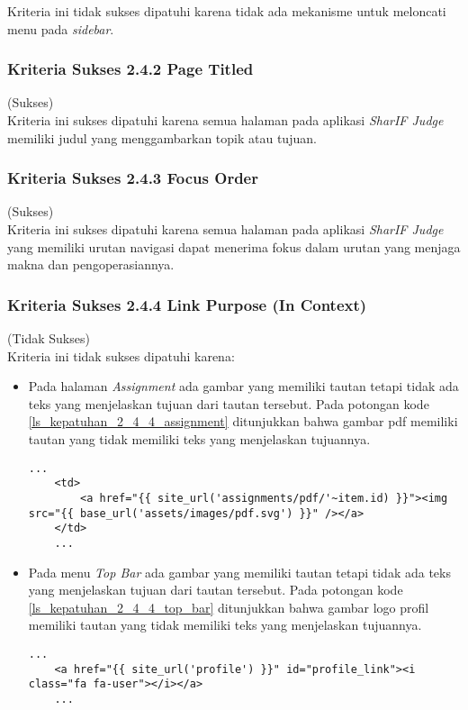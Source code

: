 Kriteria ini tidak sukses dipatuhi karena tidak ada mekanisme untuk meloncati menu pada \textit{sidebar}.

\subsubsection{Kriteria Sukses 2.4.2 Page Titled}
\label{subsubsec:kepatuhan_kriteria_2.4.2}
(Sukses) \\

Kriteria ini sukses dipatuhi karena semua halaman pada aplikasi \textit{SharIF Judge} memiliki judul yang menggambarkan topik atau tujuan.

\subsubsection{Kriteria Sukses 2.4.3 Focus Order}
\label{subsubsec:kepatuhan_kriteria_2.4.3}
(Sukses) \\

Kriteria ini sukses dipatuhi karena semua halaman pada aplikasi \textit{SharIF Judge} yang memiliki urutan navigasi dapat menerima fokus dalam urutan yang menjaga makna dan pengoperasiannya.

\subsubsection{Kriteria Sukses 2.4.4 Link Purpose (In Context)}
\label{subsubsec:kepatuhan_kriteria_2.4.4}
(Tidak Sukses) \\

Kriteria ini tidak sukses dipatuhi karena:
\begin{itemize}
	\item Pada halaman \textit{Assignment} ada gambar yang memiliki tautan tetapi tidak ada teks yang menjelaskan tujuan dari tautan tersebut. Pada potongan kode \ref{ls_kepatuhan_2_4_4_assignment} ditunjukkan bahwa gambar pdf memiliki tautan yang tidak memiliki teks yang menjelaskan tujuannya.
	\begin{lstlisting}[basicstyle=\ttfamily, frame=single,
	columns=fullflexible, keepspaces=true, breaklines=true, label=ls_kepatuhan_2_4_4_assignment, caption=Kriteria Sukses 2.4.4 - Gambar PDF]
	...
	<td>
		<a href="{{ site_url('assignments/pdf/'~item.id) }}"><img src="{{ base_url('assets/images/pdf.svg') }}" /></a>
	</td>
	...
	\end{lstlisting}
	
	\item Pada menu \textit{Top Bar} ada gambar yang memiliki tautan tetapi tidak ada teks yang menjelaskan tujuan dari tautan tersebut. Pada potongan kode \ref{ls_kepatuhan_2_4_4_top_bar} ditunjukkan bahwa gambar logo profil memiliki tautan yang tidak memiliki teks yang menjelaskan tujuannya.
	\begin{lstlisting}[basicstyle=\ttfamily, frame=single,
	columns=fullflexible, keepspaces=true, breaklines=true, label=ls_kepatuhan_2_4_4_top_bar, caption=Kriteria Sukses 2.4.4 - Gambar Logo Profile]
	...
	<a href="{{ site_url('profile') }}" id="profile_link"><i class="fa fa-user"></i></a>
	...
	\end{lstlisting}
	
\end{itemize}

